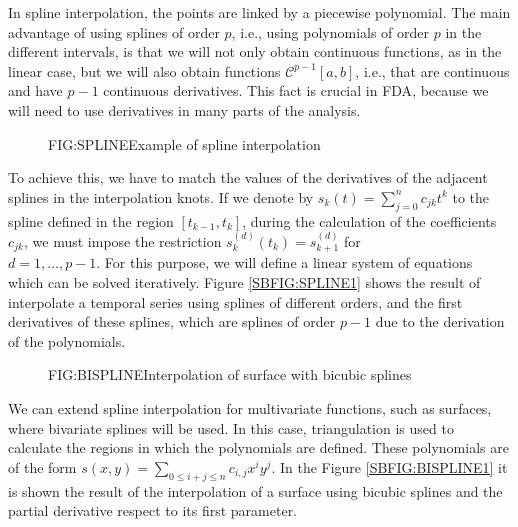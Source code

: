 
In spline interpolation\cite{Boor1981}, the points are linked by a piecewise
polynomial.
The main advantage of using splines of order $p$, i.e., using polynomials of
order $p$ in the different intervals, is that we will not only obtain continuous
functions, as in the linear case, but we will also obtain functions
$\mathcal{C}^{p-1}[a,b]$, i.e., that are continuous and have $p-1$ continuous
derivatives. This fact is crucial in \acs{FDA}, because we will need
to use derivatives in many parts of the analysis.

\begin{figure}[Example of spline interpolation]{FIG:SPLINE}{Example of spline interpolation}
	 \quad
\end{figure}

To achieve this, we have to match the values of the derivatives of the
adjacent splines in the interpolation knots. If we denote by
$s_k(t)=\sum_{j=0}^n c_{jk} t^k$ to the spline defined in the region
$[t_{k-1}, t_{k}]$, during the calculation of the coefficients $c_{jk}$, we must
impose the restriction $s_{k}^{(d)}(t_k) = s_{k+1}^{(d)}$ for \\ $d=1, \dots, p-1$.
For this purpose, we will define a linear system of equations which can be
solved iteratively. Figure \ref{SBFIG:SPLINE1} shows the result of interpolate a
temporal series using splines of different orders, and the first derivatives of
these splines, which are splines of order $p-1$ due to the derivation of the
polynomials.

\begin{figure}[Interpolation of surface]{FIG:BISPLINE}{Interpolation of surface with bicubic splines}
	 \quad
\end{figure}

We can extend spline interpolation for multivariate functions, such as surfaces,
where bivariate splines will be used. In this case, triangulation is used
to calculate the regions in which the polynomials are defined. These polynomials
are of the form $s(x, y) = \sum_{0 \le i + j \le n} c_{i,j}x^i y^j$.
In the Figure \ref{SBFIG:BISPLINE1} it is shown the result of the
interpolation of a surface using bicubic splines and the partial derivative
respect to its first parameter.
